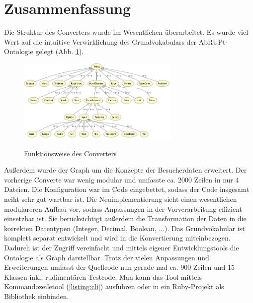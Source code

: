 \documentclass[runningheads,a4paper]{llncs}
\begin{document}
\section{Zusammenfassung}
\label{sec:conclusion}

Die Struktur des Converters wurde im Wesentlichen überarbeitet.
Es wurde viel Wert auf die intuitive Verwirklichung des Grundvokabulars der AbRUPt-Ontologie gelegt (Abb. \ref{fig:onto}).

\begin{figure}
\caption{Funktionsweise des Converters}
\centering
\includegraphics[width=0.7\textwidth]{figures/tbox}
\label{fig:onto}
\end{figure}

Außerdem wurde der Graph um die Konzepte der Besucherdaten erweitert.
Der vorherige Converte war wenig modular und umfasste ca. 2000 Zeilen in nur 4 Dateien.
Die Konfiguration war im Code eingebettet, sodass der Code insgesamt nciht sehr gut wartbar ist.
Die Neuimplementierung sieht einen wesentlichen modulareren Aufbau vor, sodass Anpassungen in der Vorverarbeitung effizient einsetzbar ist.
Sie berücksichtigt außerdem die Transformation der Daten in die korrekten Datentypen (Integer, Decimal, Boolean, ...).
Das Grundvokabular ist komplett separat entwickelt und wird in die Konvertierung miteinbezogen.
Dadurch ist der Zugriff vereinfacht und mittels eigener Entwicklungstools die Ontologie als Graph darstellbar.
Trotz der vielen Anpassungen und Erweiterungen umfasst der Quellcode nun gerade mal ca. 900 Zeilen und 15 Klassen inkl. rudimentären Testcode.
Man kann das Tool mittels Kommandozeiletool (\ref{listing:cli}) ausführen oder in ein Ruby-Projekt als Bibliothek einbinden.


\end{document}
